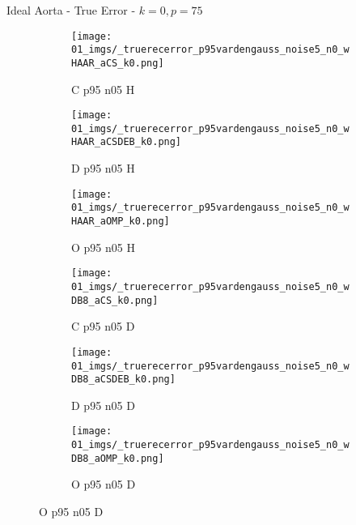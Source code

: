 \begin{frame}{Ideal Aorta - True Error - $k=0,p=75$}{}
\begin{figure}
\begin{subfigure}{0.13\textwidth}
\texttt{[image: 01\_imgs/\_truerecerror\_p95vardengauss\_noise5\_n0\_wHAAR\_aCS\_k0.png]}
\caption*{\tiny C p95 n05 H}
\end{subfigure}
\begin{subfigure}{0.13\textwidth}
\texttt{[image: 01\_imgs/\_truerecerror\_p95vardengauss\_noise5\_n0\_wHAAR\_aCSDEB\_k0.png]}
\caption*{\tiny D p95 n05 H}
\end{subfigure}
\begin{subfigure}{0.13\textwidth}
\texttt{[image: 01\_imgs/\_truerecerror\_p95vardengauss\_noise5\_n0\_wHAAR\_aOMP\_k0.png]}
\caption*{\tiny O p95 n05 H}
\end{subfigure}
\begin{subfigure}{0.13\textwidth}
\texttt{[image: 01\_imgs/\_truerecerror\_p95vardengauss\_noise5\_n0\_wDB8\_aCS\_k0.png]}
\caption*{\tiny C p95 n05 D}
\end{subfigure}
\begin{subfigure}{0.13\textwidth}
\texttt{[image: 01\_imgs/\_truerecerror\_p95vardengauss\_noise5\_n0\_wDB8\_aCSDEB\_k0.png]}
\caption*{\tiny D p95 n05 D}
\end{subfigure}
\begin{subfigure}{0.13\textwidth}
\texttt{[image: 01\_imgs/\_truerecerror\_p95vardengauss\_noise5\_n0\_wDB8\_aOMP\_k0.png]}
\caption*{\tiny O p95 n05 D}
\end{subfigure}

\vspace{5pt}


\end{figure}
\end{frame}
